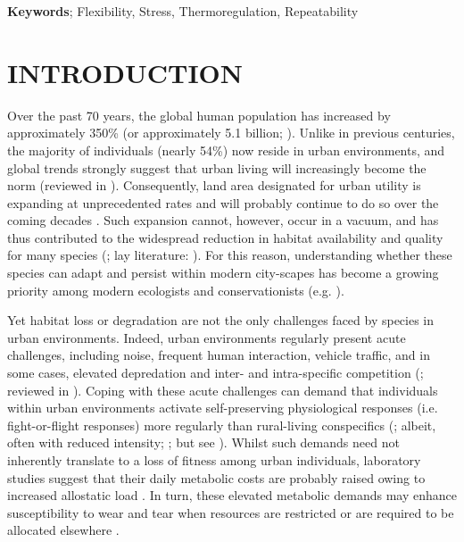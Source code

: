 \documentclass[12pt]{article}
\begin{document}
\par\noindent \textbf{Keywords}; Flexibility, Stress, Thermoregulation, Repeatability

\clearpage

\fontsize{12pt}{24pt}\selectfont
\section{INTRODUCTION}
\vspace{0.5cm}

\noindent Over the past 70 years, the global human population has increased by approximately 350\% (or approximately 5.1 billion; \citealt{un_2019}). Unlike in previous centuries, the majority of individuals (nearly 54\%) now reside in urban environments, and global trends strongly suggest that urban living will increasingly become the norm (reviewed in \citealt{lerch_2017}). Consequently, land area designated for urban utility is expanding at unprecedented rates and will probably continue to do so over the coming decades \citep{angel_2011}. Such expansion cannot, however, occur in a vacuum, and has thus contributed to the widespread reduction in habitat availability and quality for many species (\citealt{grimm_2008,seto_2012,freeman_2019}; lay literature: \citealt{thomas_2017}). For this reason, understanding whether these species can adapt and persist within modern city-scapes has become a growing priority among modern ecologists and conservationists (e.g. \citealt{birnie_2016,ouyang_2018}). \vspace{1cm}

\noindent Yet habitat loss or degradation are not the only challenges faced by species in urban environments. Indeed, urban environments regularly present acute challenges, including noise, frequent human interaction, vehicle traffic, and in some cases, elevated depredation and inter- and intra-specific competition (\citealt{johnson_2012,hernandez_2014,newsome_2015,vincze_2017}; reviewed in \citealt{lowry_2013}). Coping with these acute challenges can demand that individuals within urban environments activate self-preserving physiological responses (i.e. fight-or-flight responses) more regularly than rural-living conspecifics (\citealt{bonier_2012,watson_2017}; albeit, often with reduced intensity; \citealt{partecke_2006,french_2008}; but see \citealt{fokidis_2009}). Whilst such demands need not inherently translate to a loss of fitness among urban individuals, laboratory studies suggest that their daily metabolic costs are probably raised owing to increased allostatic load \citep{depke_2008,jimeno_2017}. In turn, these elevated metabolic demands may enhance susceptibility to wear and tear when resources are restricted or are required to be allocated elsewhere \citep{romero_2009,breuner_2019}. \vspace{1cm}
\end{document}
